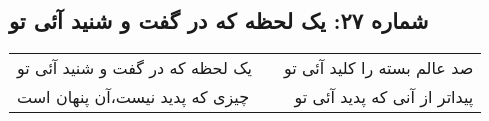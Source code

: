 \begin{center}
\section*{شماره ۲۷: یک لحظه که در گفت و شنید آئی تو}
\label{sec:027}
\begin{longtable}{l p{0.5cm} r}
یک لحظه که در گفت و شنید آئی تو
&&
صد عالم بسته را کلید آئی تو
\\
چیزی که پدید نیست،‌آن پنهان است
&&
پیداتر از آنی که پدید آئی تو
\\
\end{longtable}
\end{center}

